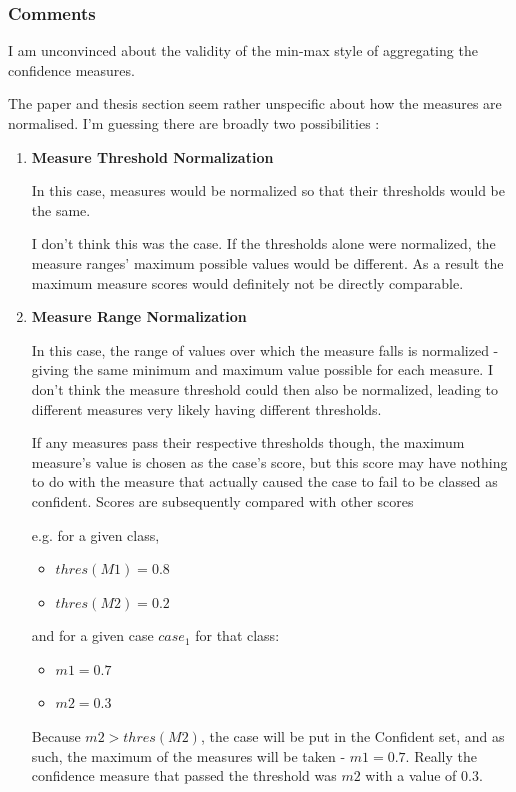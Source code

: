 \documentclass[a4paper,11pt]{report}
\begin{document}
\subsubsection{Comments}
I am unconvinced about the validity of the min-max style of aggregating the confidence measures.

The paper and thesis section seem rather unspecific about how the measures are normalised. I'm guessing there are broadly two possibilities :

\begin{enumerate}
	\item \textbf{Measure Threshold Normalization}
	
	In this case, measures would be normalized so that their thresholds would be the same.
	
	I don't think this was the case. If the thresholds alone were normalized, the measure ranges' maximum possible values would be different. As a result the maximum measure scores would definitely not be directly comparable.
	
	\item \textbf{Measure Range Normalization}
	
	In this case, the range of values over which the measure falls is normalized - giving the same minimum and maximum value possible for each measure. I don't think the measure threshold could then also be normalized, leading to different measures very likely having different thresholds. 
	
	If any measures pass their respective thresholds though, the maximum measure's value is chosen as the case's score, but this score may have nothing to do with the measure that actually caused the case to fail to be classed as confident. Scores are subsequently compared with other scores
	
	e.g. for a given class, 
	\begin{itemize}
		\item $thres(M1) = 0.8$
		\item $thres(M2) = 0.2$
	\end{itemize}
	and for a given case $case_{1}$ for that class:
	\begin{itemize}
		\item $m1 = 0.7$
		\item $m2 = 0.3$
	\end{itemize}  
	
	Because $m2 > thres(M2)$, the case will be put in the Confident set, and as such, the maximum of the measures will be taken - $m1=0.7$. Really the confidence measure that passed the threshold was $m2$ with a value of $0.3$.
	

\end{enumerate}
\end{document}
